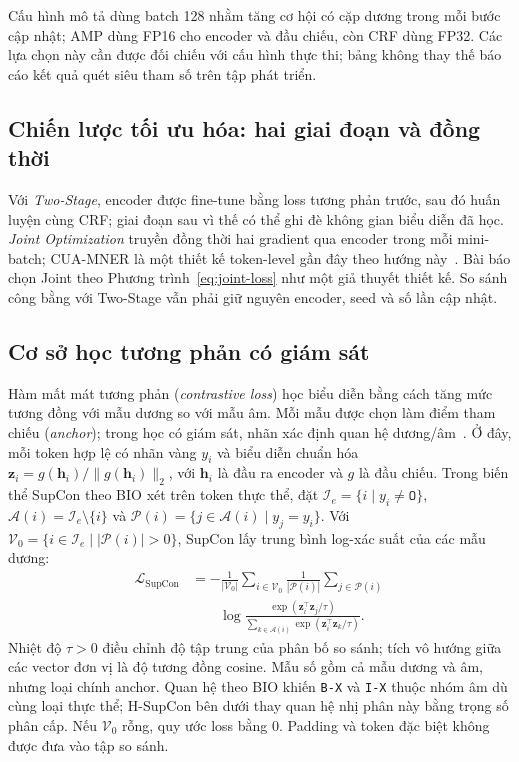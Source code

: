 \documentclass[conference,a4paper]{IEEEtran}
\begin{document}
Cấu hình mô tả dùng batch 128 nhằm tăng cơ hội có cặp dương trong mỗi
bước cập nhật; AMP dùng FP16 cho encoder và đầu chiếu, còn CRF dùng FP32.
Các lựa chọn này cần được đối chiếu với cấu hình thực thi; bảng không
thay thế báo cáo kết quả quét siêu tham số trên tập phát triển.

\subsection{Chiến lược tối ưu hóa: hai giai đoạn và đồng thời}\label{subsec:optimization}
Với \textit{Two-Stage}, encoder được fine-tune bằng loss tương phản trước,
sau đó huấn luyện cùng CRF; giai đoạn sau vì thế có thể ghi đè không gian
biểu diễn đã học. \textit{Joint Optimization} truyền đồng thời hai gradient
qua encoder trong mỗi mini-batch; CUA-MNER là một thiết kế token-level gần
đây theo hướng này~\cite{yang2026cuamner}. Bài báo chọn Joint theo
Phương trình~\eqref{eq:joint-loss} như một giả thuyết thiết kế. So sánh công
bằng với Two-Stage vẫn phải giữ nguyên encoder, seed và số lần cập nhật.

\subsection{Cơ sở học tương phản có giám sát}\label{subsec:contrastive}

Hàm mất mát tương phản (\textit{contrastive loss}) học biểu diễn bằng
cách tăng mức tương đồng với mẫu dương so với mẫu âm. Mỗi mẫu được chọn
làm điểm tham chiếu (\textit{anchor}); trong học có giám sát, nhãn xác
định quan hệ dương/âm~\cite{khosla2020supcon}. Ở đây, mỗi token hợp lệ
có nhãn vàng $y_i$ và biểu diễn chuẩn hóa
$\mathbf z_i=g(\mathbf h_i)/\|g(\mathbf h_i)\|_2$, với $\mathbf h_i$
là đầu ra encoder và $g$ là đầu chiếu.
Trong biến thể SupCon theo BIO xét trên token thực thể, đặt
$\mathcal I_e=\{i\mid y_i\ne\texttt{O}\}$,
$\mathcal A(i)=\mathcal I_e\setminus\{i\}$ và
$\mathcal P(i)=\{j\in\mathcal A(i)\mid y_j=y_i\}$.
Với $\mathcal V_0=\{i\in\mathcal I_e\mid |\mathcal P(i)|>0\}$,
SupCon lấy trung bình log-xác suất của các mẫu dương:
\begin{equation}
\begin{aligned}
\mathcal L_{\mathrm{SupCon}}
&=-\frac{1}{|\mathcal V_0|}\sum_{i\in\mathcal V_0}
\frac{1}{|\mathcal P(i)|}\sum_{j\in\mathcal P(i)}\\
&\qquad\log\frac{\exp(\mathbf z_i^\top\mathbf z_j/\tau)}
{\sum_{k\in\mathcal A(i)}\exp(\mathbf z_i^\top\mathbf z_k/\tau)}.
\end{aligned}
\label{eq:supcon}
\end{equation}
Nhiệt độ $\tau>0$ điều chỉnh độ tập trung của phân bố so sánh; tích vô
hướng giữa các vector đơn vị là độ tương đồng cosine. Mẫu số gồm cả
mẫu dương và âm, nhưng loại chính anchor. Quan hệ theo BIO khiến
\texttt{B-X} và \texttt{I-X} thuộc nhóm âm dù cùng loại thực thể;
H-SupCon bên dưới thay quan hệ nhị phân này bằng trọng số phân cấp.
Nếu $\mathcal V_0$ rỗng, quy ước loss bằng 0. Padding và token đặc biệt
không được đưa vào tập so sánh.
\end{document}
